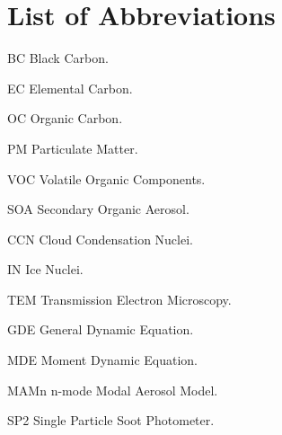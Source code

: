\documentclass[12pt, fullpage]{uiucthesis2009_2}
\begin{document}
\tableofcontents
\listoffigures

\chapter{List of Abbreviations}

\begin{symbollist*}
\item[BC] Black Carbon.
\item[EC] Elemental Carbon.
\item[OC] Organic Carbon.
\item[PM] Particulate Matter.
\item[VOC] Volatile Organic Components.
\item[SOA] Secondary Organic Aerosol.
\item[CCN] Cloud Condensation Nuclei.
\item[IN] Ice Nuclei.
\item[TEM] Transmission Electron Microscopy.
\item[GDE] General Dynamic Equation.
\item[MDE] Moment Dynamic Equation.
\item[MAMn] n-mode Modal Aerosol Model.
\item[SP2] Single Particle Soot Photometer.

\end{symbollist*}



\mainmatter
\end{document}
